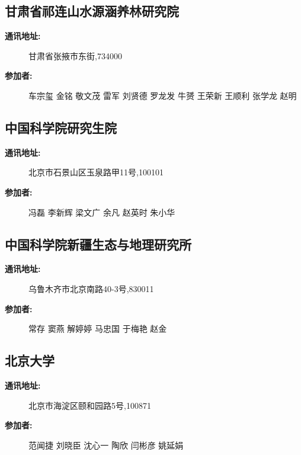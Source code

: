 \documentclass[letterpaper,10pt,english]{sphinxmanual}
\begin{document}
\subsection{甘肃省祁连山水源涵养林研究院}
\label{water_partner:id11}\begin{description}
\item[{\textbf{通讯地址:}}] \leavevmode
甘肃省张掖市东街,734000

\item[{\textbf{参加者:}}] \leavevmode
车宗玺
金铭
敬文茂
雷军
刘贤德
罗龙发
牛赟
王荣新
王顺利
张学龙
赵明

\end{description}


\subsection{中国科学院研究生院}
\label{water_partner:id12}\begin{description}
\item[{\textbf{通讯地址:}}] \leavevmode
北京市石景山区玉泉路甲11号,100101

\item[{\textbf{参加者:}}] \leavevmode
冯磊
李新辉
梁文广
余凡
赵英时
朱小华

\end{description}


\subsection{中国科学院新疆生态与地理研究所}
\label{water_partner:id13}\begin{description}
\item[{\textbf{通讯地址:}}] \leavevmode
乌鲁木齐市北京南路40-3号,830011

\item[{\textbf{参加者:}}] \leavevmode
常存
窦燕
解婷婷
马忠国
于梅艳
赵金

\end{description}


\subsection{北京大学}
\label{water_partner:id14}\begin{description}
\item[{\textbf{通讯地址:}}] \leavevmode
北京市海淀区颐和园路5号,100871

\item[{\textbf{参加者:}}] \leavevmode
范闻捷
刘晓臣
沈心一
陶欣
闫彬彦
姚延娟

\end{description}
\end{document}

